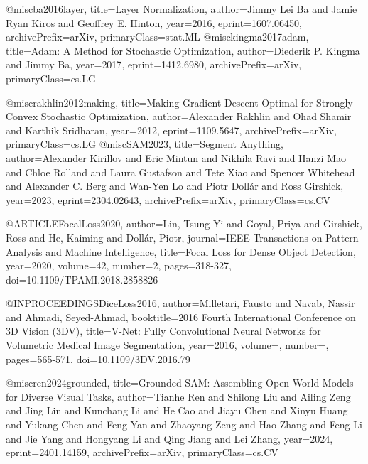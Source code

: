 @misc{ba2016layer,
title={Layer Normalization},
author={Jimmy Lei Ba and Jamie Ryan Kiros and Geoffrey E. Hinton},
year={2016},
eprint={1607.06450},
archivePrefix={arXiv},
primaryClass={stat.ML}
}
@misc{kingma2017adam,
title={Adam: A Method for Stochastic Optimization},
author={Diederik P. Kingma and Jimmy Ba},
year={2017},
eprint={1412.6980},
archivePrefix={arXiv},
primaryClass={cs.LG}
}

@misc{rakhlin2012making,
title={Making Gradient Descent Optimal for Strongly Convex Stochastic Optimization},
author={Alexander Rakhlin and Ohad Shamir and Karthik Sridharan},
year={2012},
eprint={1109.5647},
archivePrefix={arXiv},
primaryClass={cs.LG}
}
@misc{SAM2023,
title={Segment Anything},
author={Alexander Kirillov and Eric Mintun and Nikhila Ravi and Hanzi Mao and Chloe Rolland and Laura Gustafson and Tete Xiao and Spencer Whitehead and Alexander C. Berg and Wan-Yen Lo and Piotr Dollár and Ross Girshick},
year={2023},
eprint={2304.02643},
archivePrefix={arXiv},
primaryClass={cs.CV}
}

@ARTICLE{FocalLoss2020,
author={Lin, Tsung-Yi and Goyal, Priya and Girshick, Ross and He, Kaiming and Dollár, Piotr},
journal={IEEE Transactions on Pattern Analysis and Machine Intelligence},
title={Focal Loss for Dense Object Detection},
year={2020},
volume={42},
number={2},
pages={318-327},
doi={10.1109/TPAMI.2018.2858826}}

@INPROCEEDINGS{DiceLoss2016,
author={Milletari, Fausto and Navab, Nassir and Ahmadi, Seyed-Ahmad},
booktitle={2016 Fourth International Conference on 3D Vision (3DV)},
title={V-Net: Fully Convolutional Neural Networks for Volumetric Medical Image Segmentation},
year={2016},
volume={},
number={},
pages={565-571},
doi={10.1109/3DV.2016.79}}

@misc{ren2024grounded,
title={Grounded {SAM}: Assembling Open-World Models for Diverse Visual Tasks},
author={Tianhe Ren and Shilong Liu and Ailing Zeng and Jing Lin and Kunchang Li and He Cao and Jiayu Chen and Xinyu Huang and Yukang Chen and Feng Yan and Zhaoyang Zeng and Hao Zhang and Feng Li and Jie Yang and Hongyang Li and Qing Jiang and Lei Zhang},
year={2024},
eprint={2401.14159},
archivePrefix={arXiv},
primaryClass={cs.CV}
}

